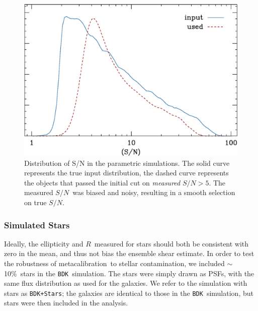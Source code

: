 \documentclass[iop]{emulateapj}
\newcommand{\snr}{$S/N$}
\newcommand{\mcal}{metacalibration}
\newcommand{\mcalR}{\mbox{\boldmath $R$}}
\newcommand{\nsimNstarperc}{10\%}
\newcommand{\bdsim}{\texttt{BDK}}
\newcommand{\bdstar}{\texttt{BDK+Stars}}
\begin{document}
\begin{figure}
    \centering
    \includegraphics[width=\columnwidth]{run-bdj03mcal02-s2n.eps}

    \caption{Distribution of S/N in the parametric simulations. The
    solid curve represents the true input distribution, the dashed curve 
	represents the objects that passed the initial cut on {\it measured}
    \snr$ > 5$. The measured \snr\ was biased and noisy,
    resulting in a smooth selection on true \snr.}

\label{fig:s2n}
\end{figure}

\subsubsection{Simulated Stars}

Ideally, the ellipticity and \mcalR\ measured for stars should both be
consistent with zero in the mean, and thus not bias the ensemble shear
estimate.  In order to test the robustness of \mcal\ to stellar contamination,
we included $\sim$\nsimNstarperc\ stars in the \bdsim\ simulation.  The stars
were simply drawn as PSFs, with the same flux distribution as used for the
galaxies.  We refer to the simulation with stars as \bdstar; the
galaxies are identical to those in the \bdsim\ simulation, but stars
were then included in the analysis.
\end{document}
